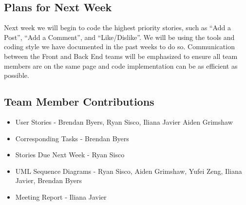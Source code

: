 \documentclass[12pt]{article}
\begin{document}
\subsection{Plans for Next Week}

Next week we will begin to code the highest priority stories, such as “Add a
Post”, “Add a Comment”, and “Like/Dislike”. We will be using the tools and
coding style we have documented in the past weeks to do so. Communication
between the Front and Back End teams will be emphasized to ensure all team
members are on the same page and code implementation can be as efficient as
possible.

\subsection{Team Member Contributions}

\begin{itemize}
  \item User Stories - Brendan Byers, Ryan Sisco, Iliana Javier Aiden Grimshaw
  \item Corresponding Tasks - Brendan Byers
  \item Stories Due Next Week - Ryan Sisco
  \item UML Sequence Diagrams - Ryan Sisco, Aiden Grimshaw, Yufei Zeng, Iliana Javier, Brendan Byers
  \item Meeting Report -  Iliana Javier
\end{itemize}
\end{document}
